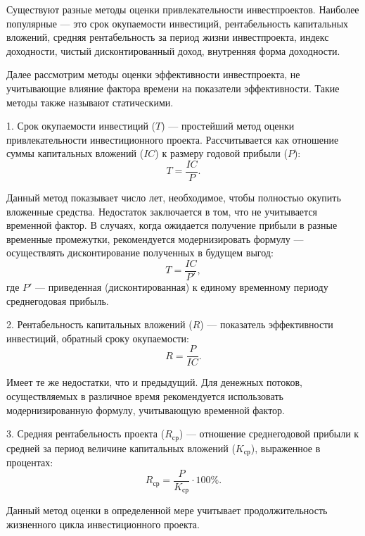 Существуют разные методы оценки привлекательности инвестпроектов. Наиболее популярные --- это срок окупаемости инвестиций, рентабельность капитальных вложений, средняя рентабельность за период жизни инвестпроекта, индекс доходности, чистый дисконтированный доход, внутренняя форма доходности.

Далее рассмотрим методы оценки эффективности инвестпроекта, не учитывающие влияние фактора времени на показатели эффективности. Такие методы также называют статическими.

1. Срок окупаемости инвестиций ($T$) --- простейший метод оценки привлекательности инвестиционного проекта. Рассчитывается как отношение суммы капитальных вложений ($IC$) к размеру годовой прибыли ($P$):
\begin{equation}\label{eq:srok_okup}
T=\dfrac{IC}{P}.
\end{equation}

Данный метод показывает число лет, необходимое, чтобы полностью окупить вложенные средства. Недостаток заключается в том, что не учитывается временной фактор. В случаях, когда ожидается получение прибыли в разные временные промежутки, рекомендуется модернизировать формулу --- осуществлять дисконтирование полученных в будущем выгод:
\begin{equation}\label{eq:srok_okup_disk}
T = \dfrac{IC}{P'},
\end{equation}
где $P'$ --- приведенная (дисконтированная) к единому временному периоду среднегодовая прибыль.

2. Рентабельность капитальных вложений ($R$) --- показатель эффективности инвестиций, обратный сроку окупаемости:
\begin{equation}\label{eq:rentab}
R = \dfrac{P}{IC}.
\end{equation}

Имеет те же недостатки, что и предыдущий. Для денежных потоков, осуществляемых в различное время рекомендуется использовать модернизированную формулу, учитывающую 
временной фактор.

3. Средняя рентабельность проекта ($R_{\text{ср}}$) --- отношение среднегодовой прибыли к средней за период величине капитальных вложений ($K_{\text{ср}}$), выраженное в процентах:
\begin{equation}\label{sred_rentab}
R_{\text{ср}} = \dfrac{P}{K_{\text{ср}}} \cdot 100\%.
\end{equation}

Данный метод оценки в определенной мере учитывает продолжительность жизненного цикла инвестиционного проекта.

